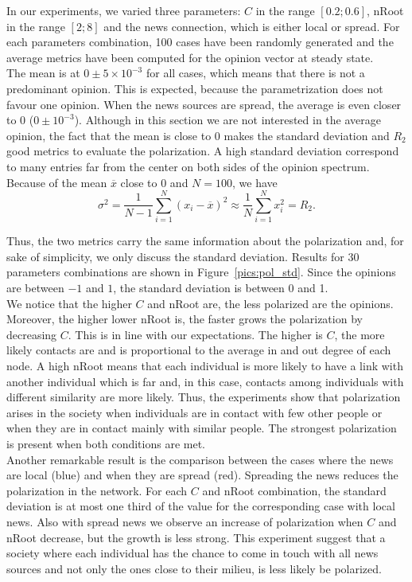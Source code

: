 In our experiments, we varied three parameters: $C$ in the range $[0.2; 0.6]$, nRoot in the range $[2; 8]$ and the news connection, which is either local or spread. For each parameters combination, 100 cases have been randomly generated and the average metrics have been computed for the opinion vector at steady state.\\

The mean is at  $0 \pm 5\times 10^{-3}$ for all cases, which means that there is not a predominant opinion. This is expected, because the parametrization does not favour one opinion. When the news sources are spread, the average is even closer to 0 ($0 \pm 10^{-3}$). Although in this section we are not interested in the average opinion, the fact that the mean is close to 0 makes the standard deviation and $R_2$ good metrics to evaluate the polarization. A high standard deviation correspond to many entries far from the center on both sides of the opinion spectrum.\\

Because of the mean $\overline{x}$ close to 0 and $N=100$, we have
$$ \sigma^2 = \frac{1}{N-1} \sum_{i=1}^N (x_i-\overline{x})^2 \approx \frac{1}{N} \sum_{i=1}^N x_i^2 = R_2.$$

Thus, the two metrics carry the same information about the polarization and, for sake of simplicity, we only discuss the standard deviation. Results for 30 parameters combinations are shown in Figure~\ref{pics:pol_std}. Since the opinions are between $-1$ and $1$, the standard deviation is between 0 and 1.\\

We notice that the higher $C$ and nRoot are, the less polarized are the opinions. Moreover, the higher lower nRoot is, the faster grows the polarization by decreasing $C$. This is in line with our expectations. The higher is $C$, the more likely contacts are and is proportional to the average in and out degree of each node. A high nRoot means that each individual is more likely to have a link with another individual which is far and, in this case, contacts among individuals with different similarity are more likely. Thus, the experiments show that polarization arises in the society when individuals are in contact with few other people or when they are in contact mainly with similar people. The strongest polarization is present when both conditions are met.\\

Another remarkable result is the comparison between the cases where the news are local (blue) and when they are spread (red). Spreading the news reduces the polarization in the network. 
For each $C$ and nRoot combination, the standard deviation is at most one third of the value for the corresponding case with local news. Also with spread news we observe an increase of polarization when $C$ and nRoot decrease, but the growth is less strong. This experiment suggest that a society where each individual has the chance to come in touch with all news sources and not only the ones close to their milieu, is less likely be polarized.

